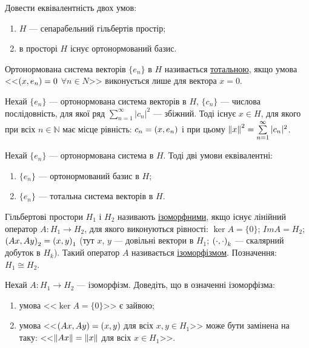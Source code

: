 \begin{exercise}
    Довести еквівалентність двох умов:
    \begin{enumerate}[label=\ukr*)]
        \item $H$ --- сепарабельний гільбертів простір;
        \item в просторі $H$ існує ортонормований базис.
    \end{enumerate}
\end{exercise}

\begin{theory}
    Ортонормована система векторів $\{e_n\}$ в $H$ називається \underline{тотальною}, 
    якщо умова <<$\left(x, e_n\right) = 0$ $\forall n \in N$>> виконується лише для вектора $x=0$.
\end{theory}

\begin{exercise}
    Нехай $\{e_n\}$ --- ортонормована система векторів в $H$, $\{c_n\}$ --- числова послідовність,
    для якої ряд $\sum\limits_{n=1}^\infty |c_n|^2$ --- збіжний. Тоді існує $x \in H$, 
    для якого при всіх $n \in \mathbb{N}$ має місце рівність: $c_n = \left(x, e_n\right)$ і при цьому 
    $\left\lVert x\right\rVert^2 = \sum\limits_{n=1}^\infty |c_n|^2$.
\end{exercise}

\begin{exercise}
    Нехай $\{e_n\}$ --- ортонормована система в $H$. Тоді дві умови еквівалентні:
    \begin{enumerate}[label=\ukr*)]
        \item $\{e_n\}$ --- ортонормований базис в $H$;
        \item $\{e_n\}$ --- тотальна система векторів в $H$.
    \end{enumerate}
\end{exercise}

\begin{theory}
    Гільбертові простори $H_1$ і $H_2$ називають \underline{ізоморфними}, якщо існує 
    лінійний оператор $A: H_1 \rightarrow H_2$, для якого виконуються рівності: 
    $\ker A = \{0\}$; $ImA = H_2$; $\left(Ax, Ay\right)_2 = \left(x, y\right)_1$ (тут $x$, $y$ --- довільні 
    вектори в $H_1$; $\left(\cdot, \cdot\right)_k$ --- скалярний добуток в $H_k$). 
    Такий оператор $A$ називається \underline{ізоморфізмом}. Позначення: $H_1 \cong H_2 $.
\end{theory}

\begin{exercise}
    Нехай $A: H_1 \rightarrow H_2$ --- ізоморфізм. Доведіть, що в означенні ізоморфізма:
    \begin{enumerate}[label=\ukr*)]
        \item умова <<$\ker A = \{0\}$>> є зайвою;
        \item умова <<$\left(Ax, Ay\right) = \left(x, y\right)$ для всіх $x, y \in H_1$>> може бути 
        замінена на таку: <<$\left\lVert Ax\right\rVert = \left\lVert x\right\rVert$ для всіх $x \in H_1$>>.
    \end{enumerate}
\end{exercise}